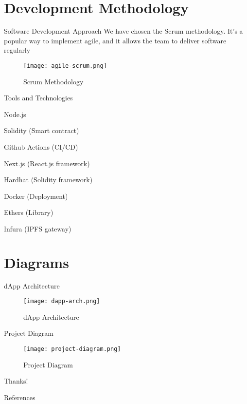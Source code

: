 \documentclass[aspectratio=169,usenames,dvipsnames,pdftex]{beamer}
\begin{document}
  \section{Development Methodology}

  \begin{frame}{Software Development Approach}
    We have chosen the Scrum methodology. It’s a popular way to implement agile, and it allows the team to deliver software regularly
    \begin{figure}
      \texttt{[image: agile-scrum.png]}
      \caption{Scrum Methodology}
    \end{figure}
  \end{frame}

  \begin{frame}{Tools and Technologies}
    \begin{itemize}
      \begin{multicols}{2}
      \item \faNode{} Node.js
      \item Solidity (Smart contract)
      \item \faCodeBranch{} Github Actions (CI/CD)
      \item \faReact{} Next.js (React.js framework)
      \item Hardhat (Solidity framework)
      \item \faDocker{} Docker (Deployment)
      \item Ethers (Library)
      \item Infura (IPFS gateway)
      \end{multicols}
    \end{itemize}
  \end{frame}

  \section{Diagrams}

  \begin{frame}{dApp Architecture}
    \begin{figure}
      \texttt{[image: dapp-arch.png]}
      \caption{dApp Architecture}
    \end{figure}
  \end{frame}

  \begin{frame}{Project Diagram}
    \begin{figure}
      \texttt{[image: project-diagram.png]}
      \caption{Project Diagram}
    \end{figure}
  \end{frame}

	\begin{frame}[standout]
		Thanks!
	\end{frame}

	\begin{frame}[allowframebreaks]{References}
    \nocite{*}
    
		
	\end{frame}
\end{document}
